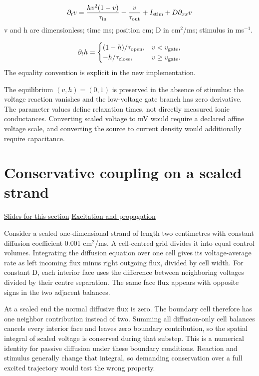 \documentclass[11pt,letterpaper]{article}
\theoremstyle{definition}\newtheorem{definition}{Definition}\newtheorem{example}{Example}
\numberwithin{equation}{section}
\begin{document}
\[
\partial_t v=\frac{hv^2(1-v)}{\tau_{\rm in}}-\frac{v}{\tau_{\rm out}}+I_{\rm stim}+D\partial_{xx}v
\]
v and h are dimensionless; time ms; position cm; D in cm\ensuremath{^{2}}/ms; stimulus in ms\ensuremath{^{-1}}.

\[
\partial_t h=\begin{cases}(1-h)/\tau_{\rm open},&v<v_{\rm gate},\\-h/\tau_{\rm close},&v\ge v_{\rm gate}.\end{cases}
\]
The equality convention is explicit in the new implementation.

The equilibrium $(v,h)=(0,1)$ is preserved in the absence of stimulus: the voltage reaction vanishes and the low-voltage gate branch has zero derivative. The parameter values define relaxation times, not directly measured ionic conductances. Converting scaled voltage to mV would require a declared affine voltage scale, and converting the source to current density would additionally require capacitance.
\section{Conservative coupling on a sealed strand}
\hypertarget{note-conservative-coupling-on-a-sealed-strand}{}\label{note:conservative-coupling-on-a-sealed-strand}
{\small \href{slides.html\#frame=shared-diffusive-face-fluxes\&step=1}{Slides for this section} \quad \href{../modules/animations/excitable-wave.html}{Excitation and propagation}}\par
Consider a sealed one-dimensional strand of length two centimetres with constant diffusion coefficient 0.001 cm\ensuremath{^{2}}/ms. A cell-centred grid divides it into equal control volumes. Integrating the diffusion equation over one cell gives its voltage-average rate as left incoming flux minus right outgoing flux, divided by cell width. For constant D, each interior face uses the difference between neighboring voltages divided by their centre separation. The same face flux appears with opposite signs in the two adjacent balances.

At a sealed end the normal diffusive flux is zero. The boundary cell therefore has one neighbor contribution instead of two. Summing all diffusion-only cell balances cancels every interior face and leaves zero boundary contribution, so the spatial integral of scaled voltage is conserved during that substep. This is a numerical identity for passive diffusion under these boundary conditions. Reaction and stimulus generally change that integral, so demanding conservation over a full excited trajectory would test the wrong property.
\end{document}
